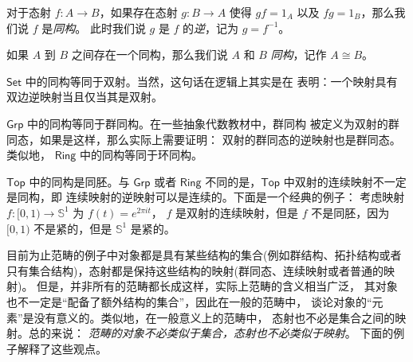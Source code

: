 \documentclass[fontset=none]{Notes}
\newcommand{\cat}[1]{\mathsf{#1}}
\begin{document}
\begin{definition}
  对于态射 $f:A\to B$，如果存在态射 $g:B\to A$ 使得
  $gf=1_A$ 以及 $fg=1_B$，那么我们说 $f$ 是\emph{同构}。
  此时我们说 $g$ 是 $f$ 的\emph{逆}，记为 $g=f^{-1}$。
\end{definition}

如果 $A$ 到 $B$ 之间存在一个同构，那么我们说 $A$ 和
$B$ \emph{同构}，记作 $A\cong B$。

\begin{example}
  $\cat{Set}$ 中的同构等同于双射。当然，这句话在逻辑上其实是在
  表明：一个映射具有双边逆映射当且仅当其是双射。
\end{example}

\begin{example}
  $\cat{Grp}$ 中的同构等同于群同构。在一些抽象代数教材中，群同构
  被定义为双射的群同态，如果是这样，那么实际上需要证明：
  双射的群同态的逆映射也是群同态。类似地，
  $\cat{Ring}$ 中的同构等同于环同构。
\end{example}

\begin{example}
  $\cat{Top}$ 中的同构是同胚。与 $\cat{Grp}$ 或者 $\cat{Ring}$
  不同的是，$\cat{Top}$ 中双射的连续映射不一定是同构，即
  连续映射的逆映射可以是连续的。下面是一个经典的例子：
  考虑映射 $f:[0,1)\to \mathbb{S}^1$ 为 $f(t)=e^{2\pi it}$，
  $f$ 是双射的连续映射，但是 $f$ 不是同胚，因为 $[0,1)$
  不是紧的，但是 $\mathbb{S}^1$ 是紧的。
\end{example}

目前为止范畴的例子中对象都是具有某些结构的集合(例如群结构、拓扑结构或者
只有集合结构)，态射都是保持这些结构的映射(群同态、连续映射或者普通的映射)。
但是，并非所有的范畴都长成这样，实际上范畴的含义相当广泛，
其对象也不一定是“配备了额外结构的集合”，因此在一般的范畴中，
谈论对象的“元素”是没有意义的。类似地，在一般意义上的范畴中，
态射也不必是集合之间的映射。总的来说：
\emph{范畴的对象不必类似于集合，态射也不必类似于映射}。
下面的例子解释了这些观点。
\end{document}
